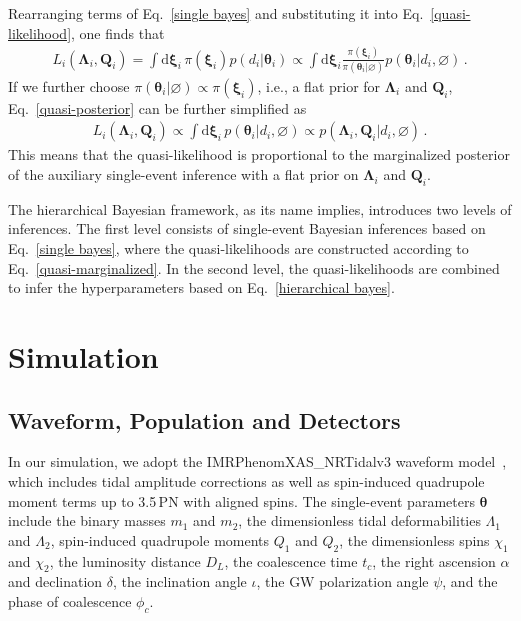 \documentclass[a4paper,11pt]{article}
\begin{document}
Rearranging terms of Eq.~\eqref{single bayes} and substituting it into
Eq.~\eqref{quasi-likelihood}, one finds that
\begin{equation}
\label{quasi-posterior}
\begin{aligned}
    L_i(\bm{\Lambda}_i,\bm{Q}_i) = \int \text{d}\bm{\xi}_i \,
    \pi(\bm{\xi}_i)p(d_i|\bm{\theta}_i) \propto \int \text{d}\bm{\xi}_i
    \frac{\pi(\bm{\xi}_i)}{\pi(\bm{\theta}_i
    |\varnothing)}p(\bm{\theta}_i|d_i,\varnothing)\,.
\end{aligned}  
\end{equation}
If we further choose $\pi(\bm{\theta}_i|\varnothing) \propto\pi(\bm{\xi}_i)$, 
i.e., a flat prior for $\bm{\Lambda}_i$ and $\bm{Q}_i$,
Eq.~\eqref{quasi-posterior} can be further simplified as 
\begin{equation}
\label{quasi-marginalized}
\begin{aligned}
    L_i(\bm{\Lambda}_i,\bm{Q}_i) \propto \int \text{d} \bm{\xi}_i \,
    p(\bm{\theta}_i|d_i, \varnothing)\propto p(\bm{\Lambda}_i,
    \bm{Q}_i|d_i,\varnothing)\,.
\end{aligned}  
\end{equation}
This means that the quasi-likelihood is proportional to the marginalized
posterior of the auxiliary single-event inference with a flat prior on
$\bm{\Lambda}_i$ and $\bm{Q}_i$. 

The hierarchical Bayesian framework, as its name implies, introduces two levels
of inferences. The first level consists of single-event Bayesian inferences
based on Eq.~\eqref{single bayes}, where the quasi-likelihoods are constructed
according to Eq.~\eqref{quasi-marginalized}. In the second level, the
quasi-likelihoods are combined to infer the hyperparameters based on
Eq.~\eqref{hierarchical bayes}.


\section{Simulation}
\label{sec:simulation}

\subsection{Waveform, Population and Detectors}
\label{subsec:simulation_preliminaries}

In our simulation, we adopt the {\sc IMRPhenomXAS\_NRTidalv3} waveform
model~\cite{Abac:2023ujg}, which includes tidal amplitude corrections as well as
spin-induced quadrupole moment terms up to 3.5\,PN with aligned spins.  The
single-event parameters $\bm{\theta}$ include the binary masses $m_1$ and $m_2$,
the dimensionless tidal deformabilities $\Lambda_1$ and $\Lambda_2$,
spin-induced quadrupole moments $Q_1$ and $Q_2$, the dimensionless spins
$\chi_1$ and $\chi_2$, the luminosity distance $D_L$, the coalescence time $t_{c}$,
the right ascension $\alpha$ and declination $\delta$, the inclination angle
$\iota$, the GW polarization angle $\psi$, and the phase of coalescence
$\phi_{c}$.
\end{document}
